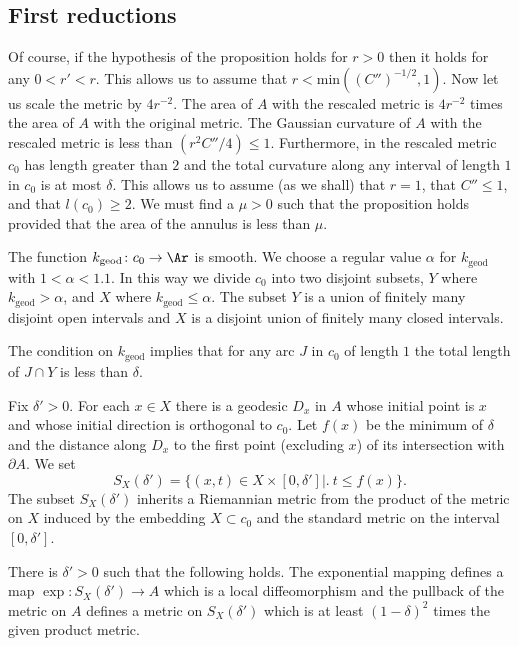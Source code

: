 \subsection{First reductions}


Of course, if the hypothesis of the proposition holds for $r>0$ then
it holds for any $0<r'<r$. This allows us to assume that $r<\mathrm{min}((C'')^{-1/2},1)$. Now let us scale the metric by $4r^{-2}$. The
area of $A$ with the rescaled metric is  $4r^{-2}$ times the area of
$A$ with the original metric. The Gaussian curvature of $A$ with the
rescaled metric is less than $(r^2C''/4)\le 1$. Furthermore, in the
rescaled metric $c_0$ has length greater than $2$ and the total
curvature along any interval of length $1$ in $c_0$ is at most
$\delta$. This allows us to assume (as we shall) that  $r=1$, that
$C''\le 1$, and that $l(c_0)\ge 2$. We must find a $\mu>0$ such that
the proposition holds provided that the area of the annulus is less
than $\mu$.



The function $k_\mathrm{geod}\colon c_0\to \Ar$ is smooth. We choose a
regular value $\alpha$ for $k_\mathrm{geod}$ with $1<\alpha<1.1$. In
this way we divide $c_0$ into two disjoint subsets, $Y$ where
$k_\mathrm{geod}>\alpha$, and $X$ where $k_\mathrm{geod}\le \alpha$. The
subset $Y$ is a union of finitely many disjoint open intervals and
$X$ is a disjoint union of finitely many closed intervals.

\begin{remark}
\label{rem:high-curvature-set-length-bound}
\label{Ylengthrem}
The condition on $k_\mathrm{geod}$ implies that for any arc $J$ in
$c_0$ of length $1$ the total
 length of $J\cap Y$ is less than $\delta$.
\end{remark}



Fix $\delta'>0$. For each $x\in X$ there is a geodesic $D_x$ in $A$
whose initial point is $x$ and whose initial direction is orthogonal
to $c_0$. Let $f(x)$ be the minimum of $\delta$ and the distance
along $D_x$ to the first point (excluding $x$) of its intersection
with $\partial A$. We set
$$S_X(\delta') =\{(x,t)\in X\times [0,\delta']\bigl|\bigr.\  t\le f(x)\}.$$
The subset $S_X(\delta')$ inherits a Riemannian metric from the
product of the  metric on $X$ induced by the embedding $X\subset
c_0$ and the standard metric on the interval $[0,\delta']$.


\begin{claim}
\label{claim:exponential-map-local-diffeomorphism}
\label{expcomp}
There is $\delta'>0$ such that the following holds.
 The
exponential mapping defines a map $\exp\colon S_X(\delta')\to
A$ which is a local diffeomorphism and the pullback of the metric on
$A$ defines a metric on $S_X(\delta')$ which is at least
$(1-\delta)^2$ times the given product metric.
\end{claim}


